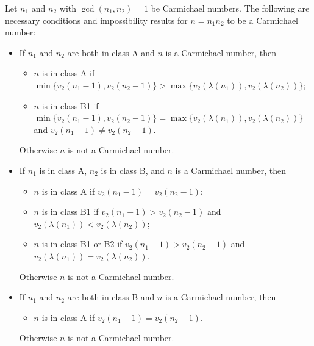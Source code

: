 \documentclass[10pt,a4paper]{amsart}
\begin{document}
\begin{lemma}\label{le:classification-products}
Let
$n_1$
and
$n_2$
with
$\gcd(n_1,n_2)=1$
be Carmichael numbers.
The following are necessary conditions and impossibility results for $n =
n_1
n_2$
to be a Carmichael number:
\begin{itemize}
\item If $n_1$ and $n_2$ are both in class A and $n$ is a Carmichael number, then
\begin{itemize}
\item $n$ is in class A if $\min\{v_2(n_1 - 1), v_2(n_2-1)\} > \max\{v_2(\lambda(n_1)), v_2(\lambda(n_2))\}$;
\item $n$ is in class B1 if  $ \min\{v_2(n_1 - 1), v_2(n_2-1)\} = \max\{v_2(\lambda(n_1)), v_2(\lambda(n_2))\}$ and $v_2(n_1 - 1) \neq v_2(n_2-1)$.
\end{itemize}
Otherwise $n$ is not a Carmichael number.
\item If $n_1$ is in class A, $n_2$ is in class B, and $n$ is a Carmichael number, then
\begin{itemize}
\item $n$ is in class A if $v_2(n_1 - 1) = v_2(n_2-1)$;
\item $n$ is in class B1 if $v_2(n_1 - 1) > v_2(n_2-1)$ and
$v_2(\lambda(n_1))<
v_2(\lambda(n_2))$;
\item $n$ is in class B1 or B2 if $v_2(n_1 - 1) > v_2(n_2-1)$ and
$v_2(\lambda(n_1))=
v_2(\lambda(n_2))$.
\end{itemize}
Otherwise $n$ is not a Carmichael number.
\item If $n_1$ and $n_2$ are both in class B and $n$ is a Carmichael number, then
\begin{itemize}
\item $n$ is in class A if $v_2(n_1 - 1) = v_2(n_2-1)$.
\end{itemize}
Otherwise $n$ is not a Carmichael number.
\end{itemize}
\end{lemma}
\end{document}
